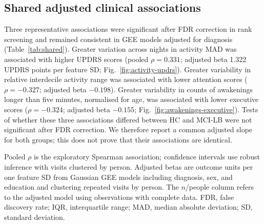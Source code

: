 \documentclass[referee,pdflatex,sn-vancouver-num]{sn-jnl}
\begin{document}
\subsection{Shared adjusted clinical associations}\label{subsec:shared-results}

Three representative associations were significant after FDR correction in
rank screening and remained consistent in GEE models adjusted for diagnosis
(Table~\ref{tab:shared}). Greater variation across nights in activity MAD was associated with
higher UPDRS scores (pooled $\rho=0.331$; adjusted beta 1.322 UPDRS points per
feature SD; Fig.~\ref{fig:activity-updrs}). Greater variability in relative
interdecile activity range was associated with lower attention scores
($\rho=-0.327$; adjusted beta $-0.198$). Greater variability in counts of
awakenings longer than five minutes, normalised for age, was associated with lower executive
scores ($\rho=-0.324$; adjusted beta $-0.155$;
Fig.~\ref{fig:awakenings-executive}). Tests of whether these three associations
differed between HC and MCI-LB were not significant after FDR correction. We
therefore report a common adjusted slope for both groups; this does not prove
that their associations are identical.

\begin{table}[t]
\caption{Primary clinical associations shared across HC and MCI-LB.}
\label{tab:shared}
\centering
\scriptsize
{}

\medskip
\begin{minipage}{0.96\textwidth}\footnotesize
Pooled $\rho$ is the exploratory Spearman association; confidence intervals
use robust inference with visits clustered by person. Adjusted betas are outcome units per one
feature SD from Gaussian GEE models including diagnosis, sex, and education and
clustering repeated visits by person. The $n$/people column refers to the
adjusted model using observations with complete data. FDR, false discovery rate; IQR, interquartile
range; MAD, median absolute deviation; SD, standard deviation.
\end{minipage}
\end{table}
\end{document}
